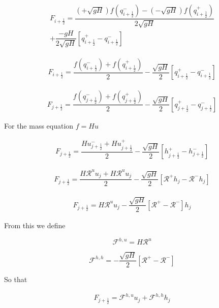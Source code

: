 \documentclass[12pt]{article}
\begin{document}
\begin{multline}
F_{i+\frac{1}{2}} = \dfrac{\left(+ \sqrt{g H}\right) f\left(q^-_{i+\frac{1}{2}}\right) - \left( - \sqrt{g H}\right) f\left(q^+_{i+\frac{1}{2}}\right)}{ 2\sqrt{g H}} \\ + \dfrac{ - g H}{ 2\sqrt{gH}} \left [ q^+_{i+\frac{1}{2}} - q^-_{i+\frac{1}{2}} \right ]
\end{multline}

\begin{multline}
F_{i+\frac{1}{2}} = \dfrac{ f\left(q^-_{i+\frac{1}{2}}\right) + f\left(q^+_{i+\frac{1}{2}}\right)}{ 2}  - \dfrac{ \sqrt{gH}}{ 2} \left [ q^+_{i+\frac{1}{2}} - q^-_{i+\frac{1}{2}} \right ]
\end{multline}

\begin{multline}
F_{j+\frac{1}{2}} = \dfrac{ f\left(q^-_{j+\frac{1}{2}}\right) + f\left(q^+_{j+\frac{1}{2}}\right)}{ 2}  - \dfrac{ \sqrt{gH}}{ 2} \left [ q^+_{j+\frac{1}{2}} - q^-_{j+\frac{1}{2}} \right ]
\end{multline}

For the mass equation $f = Hu$

\begin{multline}
F_{j+\frac{1}{2}} = \dfrac{ Hu^-_{j+\frac{1}{2}} + Hu^+_{j+\frac{1}{2}}}{ 2}  - \dfrac{ \sqrt{gH}}{ 2} \left [ h^+_{j+\frac{1}{2}} - h^-_{j+\frac{1}{2}} \right ]
\end{multline}

\begin{multline}
F_{j+\frac{1}{2}} = \dfrac{ H\mathcal{R}^uu_{j} + H\mathcal{R}^uu_{j}}{ 2}  - \dfrac{ \sqrt{gH}}{ 2} \left [ \mathcal{R}^+h_{j} - \mathcal{R}^-h_{j} \right ]
\end{multline}

\begin{multline}
F_{j+\frac{1}{2}} =  H\mathcal{R}^uu_{j}  - \dfrac{ \sqrt{gH}}{ 2} \left [ \mathcal{R}^+- \mathcal{R}^- \right ] h_{j}
\end{multline}

From this we define

\[\mathcal{F}^{h,u} = H\mathcal{R}^u\]

\[\mathcal{F}^{h,h} = -\dfrac{ \sqrt{gH}}{ 2} \left [ \mathcal{R}^+- \mathcal{R}^- \right ]\]

So that 

\begin{multline}
F_{j+\frac{1}{2}} = \mathcal{F}^{h,u}u_{j}  + \mathcal{F}^{h,h} h_{j}
\end{multline}
\end{document}
